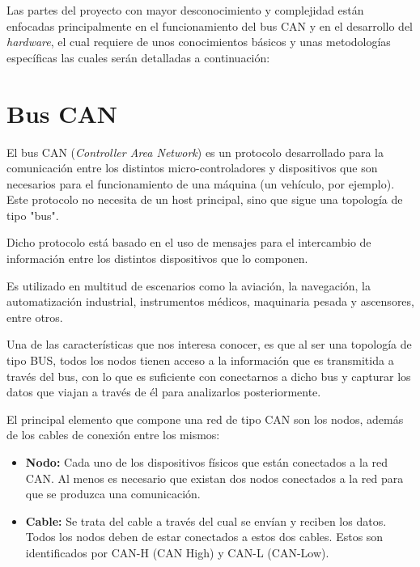 
Las partes del proyecto con mayor desconocimiento y complejidad están enfocadas principalmente en el funcionamiento del bus CAN y en el desarrollo del \emph{hardware}, el cual requiere de unos conocimientos básicos y unas metodologías específicas las cuales serán detalladas a continuación:

\section{Bus CAN}\label{bus_can}

El bus CAN (\emph{Controller Area Network})\cite{wiki:can} es un protocolo desarrollado para la comunicación entre los distintos micro-controladores y dispositivos que son necesarios para el funcionamiento de una máquina (un vehículo, por ejemplo). Este protocolo no necesita de un host principal, sino que sigue una topología de tipo "bus".


Dicho protocolo está basado en el uso de mensajes para el intercambio de información entre los distintos dispositivos que lo componen.

Es utilizado en multitud de escenarios como la aviación, la navegación, la automatización industrial, instrumentos médicos, maquinaria pesada y ascensores, entre otros.

Una de las características que nos interesa conocer, es que al ser una topología de tipo BUS, todos los nodos tienen acceso a la información que es transmitida a través del bus, con lo que es suficiente con conectarnos a dicho bus y capturar los datos que viajan a través de él para analizarlos posteriormente.


El principal elemento que compone una red de tipo CAN son los nodos, además de los cables de conexión entre los mismos:

\begin{itemize}
\item
\textbf{Nodo:} Cada uno de los dispositivos físicos que están conectados a la red CAN. Al menos es necesario que existan dos nodos conectados a la red para que se produzca una comunicación.
\item
\textbf{Cable:} Se trata del cable a través del cual se envían y reciben los datos. Todos los nodos deben de estar conectados a estos dos cables. Estos son identificados por CAN-H (CAN High) y CAN-L (CAN-Low).
\end{itemize}

